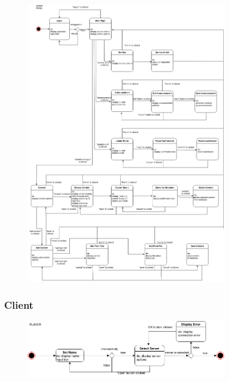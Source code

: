 \documentclass[titlepage]{article}
\begin{document}
\begin{figure}[ht]
	\centering
	\includegraphics[width=0.79\textwidth]{state_diagram_admin.png}
\end{figure}

\subsubsection{Client}

\begin{figure}[ht]
	\centering
	\includegraphics[width=0.79\textwidth]{state_diagram_player.png}
\end{figure}
\end{document}
